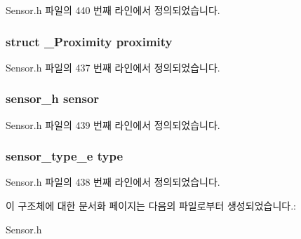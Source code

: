 Sensor.\-h 파일의 440 번째 라인에서 정의되었습니다.

\hypertarget{struct___proximity_extend_a79740711df66cd887ecab71528fc1f70}{
\subsubsection[{proximity}]{\setlength{\rightskip}{0pt plus 5cm}struct {\bf \-\_\-\-Proximity} proximity}}\label{struct___proximity_extend_a79740711df66cd887ecab71528fc1f70}


Sensor.\-h 파일의 437 번째 라인에서 정의되었습니다.

\hypertarget{struct___proximity_extend_a5bae9b7801bc3808411925cde81d3f26}{
\subsubsection[{sensor}]{\setlength{\rightskip}{0pt plus 5cm}sensor\-\_\-h sensor}}\label{struct___proximity_extend_a5bae9b7801bc3808411925cde81d3f26}


Sensor.\-h 파일의 439 번째 라인에서 정의되었습니다.

\hypertarget{struct___proximity_extend_abffb09766da2fc510a79bb51f82a36e1}{
\subsubsection[{type}]{\setlength{\rightskip}{0pt plus 5cm}sensor\-\_\-type\-\_\-e type}}\label{struct___proximity_extend_abffb09766da2fc510a79bb51f82a36e1}


Sensor.\-h 파일의 438 번째 라인에서 정의되었습니다.



이 구조체에 대한 문서화 페이지는 다음의 파일로부터 생성되었습니다.\-:\begin{DoxyCompactItemize}
\item 
Sensor.\-h\end{DoxyCompactItemize}
